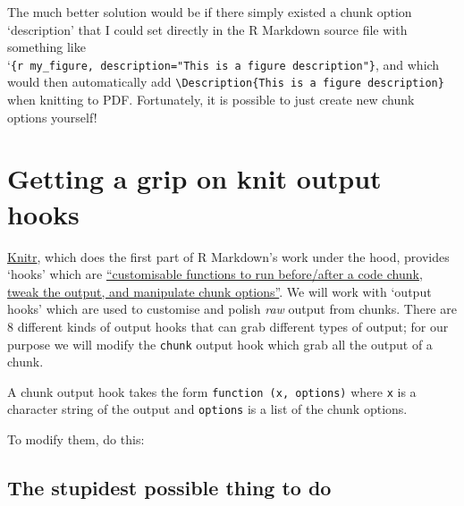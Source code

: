 \documentclass[sigchi, ]{acmart}
\newenvironment{Shaded}{\begin{snugshade}}{\end{snugshade}}
\newcommand{\CommentTok}[1]{\textcolor[rgb]{0.56,0.35,0.01}{\textit{#1}}}
\newcommand{\ControlFlowTok}[1]{\textcolor[rgb]{0.13,0.29,0.53}{\textbf{#1}}}
\newcommand{\DataTypeTok}[1]{\textcolor[rgb]{0.13,0.29,0.53}{#1}}
\newcommand{\KeywordTok}[1]{\textcolor[rgb]{0.13,0.29,0.53}{\textbf{#1}}}
\newcommand{\NormalTok}[1]{#1}
\newcommand{\OperatorTok}[1]{\textcolor[rgb]{0.81,0.36,0.00}{\textbf{#1}}}
\begin{document}
The much better solution would be if there simply existed a chunk option `description' that I could set directly in the R Markdown source file with something like `\texttt{\textasciigrave{}\textasciigrave{}\textasciigrave{}\{r\ my\_figure,\ description="This\ is\ a\ figure\ description"\}}, and which would then automatically add \texttt{\textbackslash{}Description\{This\ is\ a\ figure\ description\}} when knitting to PDF. Fortunately, it is possible to just create new chunk options yourself!

\hypertarget{getting-a-grip-on-knit-output-hooks}{%
\section{Getting a grip on knit output hooks}\label{getting-a-grip-on-knit-output-hooks}}

\href{https://yihui.name/knitr/}{Knitr}, which does the first part of R Markdown's work under the hood, provides `hooks' which are \href{https://yihui.name/knitr/hooks/}{``customisable functions to run before/after a code chunk, tweak the output, and manipulate chunk options''}. We will work with `output hooks' which are used to customise and polish \emph{raw} output from chunks. There are 8 different kinds of output hooks that can grab different types of output; for our purpose we will modify the \texttt{chunk} output hook which grab all the output of a chunk.

A chunk output hook takes the form \texttt{function\ (x,\ options)} where \texttt{x} is a character string of the output and \texttt{options} is a list of the chunk options.

To modify them, do this:

\begin{Shaded}
\end{Shaded}

\hypertarget{the-stupidest-possible-thing-to-do}{%
\subsection{The stupidest possible thing to do}\label{the-stupidest-possible-thing-to-do}}
\end{document}
